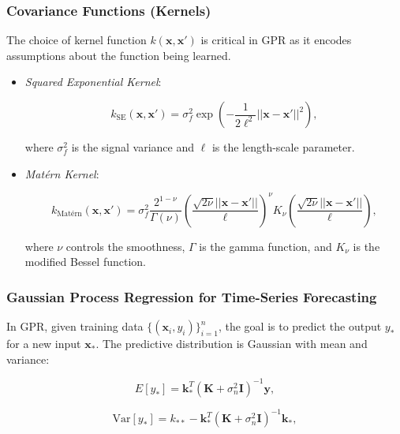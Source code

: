 \subsubsection{Covariance Functions (Kernels)}

The choice of kernel function $k(\mathbf{x}, \mathbf{x}')$ is critical in GPR as it encodes assumptions about the function being learned.


\begin{itemize}
    \item \textit{Squared Exponential Kernel}:

    \begin{equation}
        k_{\text{SE}}(\mathbf{x}, \mathbf{x}') = \sigma_f^2 \exp\left( -\frac{1}{2\ell^2} ||\mathbf{x} - \mathbf{x}'||^2 \right),
    \end{equation}

    where $\sigma_f^2$ is the signal variance and $\ell$ is the length-scale parameter.

    \item \textit{Matérn Kernel}:

    \begin{equation}
        k_{\text{Matérn}}(\mathbf{x}, \mathbf{x}') = \sigma_f^2 \frac{2^{1-\nu}}{\Gamma(\nu)} \left( \frac{\sqrt{2\nu}||\mathbf{x} - \mathbf{x}'||}{\ell} \right)^\nu K_\nu\left( \frac{\sqrt{2\nu}||\mathbf{x} - \mathbf{x}'||}{\ell} \right),
    \end{equation}

    where $\nu$ controls the smoothness, $\Gamma$ is the gamma function, and $K_\nu$ is the modified Bessel function.

\end{itemize}

\subsubsection{Gaussian Process Regression for Time-Series Forecasting}

In GPR, given training data $\{ (\mathbf{x}_i, y_i) \}_{i=1}^n$, the goal is to predict the output $y_*$ for a new input $\mathbf{x}_*$. The predictive distribution is Gaussian with mean and variance:

\begin{equation}
    E[y_*] = \mathbf{k}_*^T (\mathbf{K} + \sigma_n^2 \mathbf{I})^{-1} \mathbf{y},
\end{equation}

\begin{equation}
    \text{Var}[y_*] = k_{**} - \mathbf{k}_*^T (\mathbf{K} + \sigma_n^2 \mathbf{I})^{-1} \mathbf{k}_*,
\end{equation}

